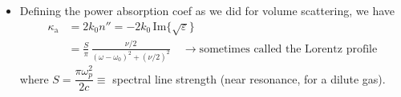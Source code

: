 \documentclass[11pt, oneside]{article}
\begin{document}
\begin{itemize}
	\item Defining the power absorption coef as we did for volume scattering, we have
	\begin{align}
		\kappa_\mathrm{a} &= 2k_0n'' = -2k_0\,\mathrm{Im}\{\sqrt{\varepsilon}\} \nonumber\\
		&= \frac{S}{\pi}\,\frac{\nu/2}{(\omega-\omega_0)^2 + (\nu/2)^2} \quad \rightarrow \text{sometimes called the Lorentz profile} \label{e:lorentz}
	\end{align}
	where $S = \dfrac{\pi\omega_p^2}{2c} \equiv$ spectral line strength (near resonance, for a dilute gas).

\end{itemize}
\end{document}
